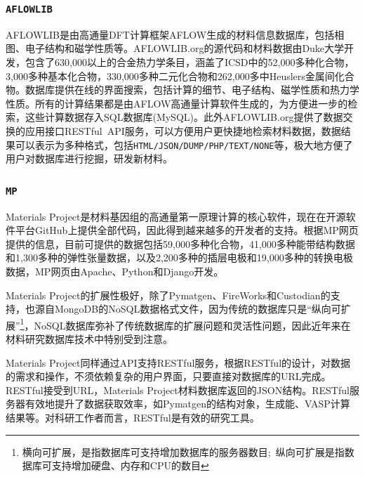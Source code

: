 \frame
{
\frametitle{\tt{AFLOWLIB}}
\textrm{AFLOWLIB}是由高通量\textrm{DFT}计算框架\textrm{AFLOW}\cite{CMS58-218_2012,CMS58-227_2012,Nat-Mater12-191_2013}生成的材料信息数据库，包括相图、电子结构和磁学性质等。\textrm{AFLOWLIB.org}的源代码和材料数据由\textrm{Duke}大学开发\cite{AFLOWORG_URL}，包含了630,000以上的合金热力学条目，涵盖了\textrm{ICSD}中的52,000多种化合物，3,000多种基本化合物，330,000多种二元化合物和262,000多中\textrm{Heuslers}金属间化合物。数据库提供在线的界面搜索，包括计算的细节、电子结构、磁学性质和热力学性质。所有的计算结果都是由\textrm{AFLOW}高通量计算软件生成的，为方便进一步的检索，这些计算数据存入\textrm{SQL}数据库(\textrm{MySQL})。此外\textrm{AFLOWLIB.org}提供了数据交换的应用接口\textrm{RESTful~API}服务\cite{CMS93-178_2014}，可以方便用户更快捷地检索材料数据，数据结果可以表示为多种格式，包括\texttt{HTML/JSON/DUMP/PHP/TEXT/NONE}等，极大地方便了用户对数据库进行挖掘，研发新材料。
}

\frame
{
\frametitle{\tt{MP}}
\textrm{Materials Project}是材料基因组的高通量第一原理计算的核心软件\cite{MP_URL}，现在在开源软件平台\textrm{GitHub}\cite{MP_Github}上提供全部代码，因此得到越来越多的开发者的支持。根据\textrm{MP}网页提供的信息\cite{MP_URL}，目前可提供的数据包括59,000多种化合物，41,000多种能带结构数据和1,300多种的弹性张量数据，以及2,200多种的插层电极和19,000多种的转换电极数据，\textrm{MP}网页由\textrm{Apache}、\textrm{Python}和\textrm{Django}开发。

\textrm{Materials Project}的扩展性极好，除了\textrm{Pymatgen}、\textrm{FireWorks}和\textrm{Custodian}的支持，也源自\textrm{MongoDB}的\textrm{NoSQL}数据格式文件，因为传统的数据库只是“纵向可扩展”\footnote{横向可扩展，是指数据库可支持增加数据库的服务器数目;~纵向可扩展是指数据库可支持增加硬盘、内存和\textrm{CPU}的数目}，\textrm{NoSQL}数据库弥补了传统数据库的扩展问题和灵活性问题，因此近年来在材料研究数据库技术中特别受到注意。

\textrm{Materials Project}同样通过\textrm{API}支持\textrm{RESTful}服务\cite{CMS68-314_2013}，根据\textrm{RESTful}的设计，对数据的需求和操作，不须依赖复杂的用户界面，只要直接对数据库的\textrm{URL}完成。\textrm{RESTful}接受到\textrm{URL}，\textrm{Materials Project}材料数据库返回的\textrm{JSON}结构。\textrm{RESTful}服务器有效地提升了数据获取效率，如\textrm{Pymatgen}的结构对象，\textrm{生成能}、\textrm{VASP}计算结果等。对科研工作者而言，\textrm{RESTful}是有效的研究工具。
}


